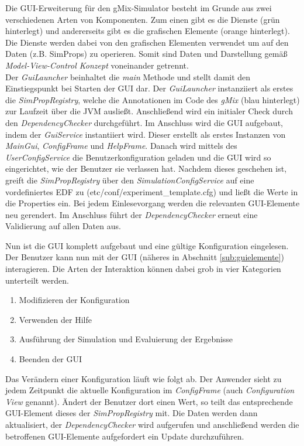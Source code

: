 \documentclass[a4paper, 11pt]{article} %
\begin{document}
Die GUI-Erweiterung für den gMix-Simulator besteht im Grunde aus zwei verschiedenen Arten von Komponenten. Zum einen gibt es die Dienste (grün hinterlegt) und andererseits gibt es die grafischen Elemente (orange hinterlegt). Die Dienste werden dabei von den grafischen Elementen verwendet um auf den Daten (z.B. SimProps) zu operieren. Somit sind Daten und Darstellung gemäß \emph{Model-View-Control Konzept} voneinander getrennt.\\

Der \emph{GuiLauncher} beinhaltet die \emph{main} Methode und stellt damit den Einstiegspunkt bei Starten der GUI dar. Der \emph{GuiLauncher} instanziiert als erstes die \emph{SimPropRegistry}, welche die Annotationen im Code des \emph{gMix} (blau hinterlegt) zur Laufzeit über die JVM ausließt. Anschließend wird ein initialer Check durch den \emph{DependencyChecker} durchgeführt. Im Anschluss wird die GUI aufgebaut, indem der \emph{GuiService} instantiiert wird. Dieser erstellt als erstes Instanzen von \emph{MainGui}, \emph{ConfigFrame} und \emph{HelpFrame}. Danach wird mittels des \emph{UserConfigService} die Benutzerkonfiguration geladen und die GUI wird so eingerichtet, wie der Benutzer sie verlassen hat. Nachdem dieses geschehen ist, greift die \emph{SimPropRegistry} über den \emph{SimulationConfigService} auf eine vordefiniertes EDF zu (etc/conf/experiment\_template.cfg) und ließt die Werte in die Properties ein. Bei jedem Einlesevorgang werden die relevanten GUI-Elemente neu gerendert. Im Anschluss führt der \emph{DependencyChecker} erneut eine Validierung auf allen Daten aus.

Nun ist die GUI komplett aufgebaut und eine gültige Konfiguration eingelesen. Der Benutzer kann nun mit der GUI (näheres in Abschnitt \ref{sub:guielemente}) interagieren. Die Arten der Interaktion können dabei grob in vier Kategorien unterteilt werden.

\begin{enumerate}
	\item Modifizieren der Konfiguration
	\item Verwenden der Hilfe
	\item Ausführung der Simulation und Evaluierung der Ergebnisse
	\item Beenden der GUI
\end{enumerate}

Das Verändern einer Konfiguration läuft wie folgt ab. Der Anwender sieht zu jedem Zeitpunkt die aktuelle Konfiguration im \emph{ConfigFrame} (auch \emph{Configuration View} genannt). Ändert der Benutzer dort einen Wert, so teilt das entsprechende GUI-Element dieses der \emph{SimPropRegistry} mit. Die Daten werden dann aktualisiert, der \emph{DependencyChecker} wird aufgerufen und anschließend werden die betroffenen GUI-Elemente aufgefordert ein Update durchzuführen.\\
\end{document}
